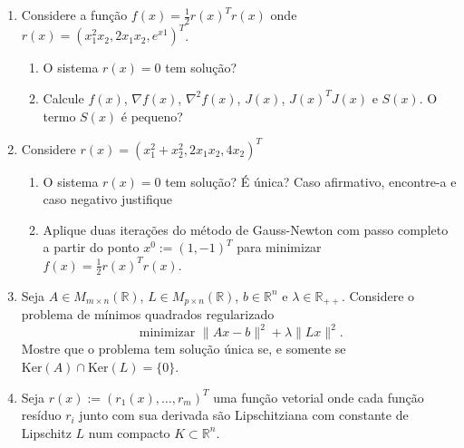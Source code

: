 \documentclass[a4paper,latin]{article}
\begin{document}
    \begin{enumerate}
    \item Considere a função 
    $f(x)=\frac{1}{2} r(x)^{T}r(x)$
    onde $r(x)=(x_{1}^{2}x_2, 2x_1x_2, e^{x1})^{T}$.
       \begin{enumerate}
       	\item O sistema $r(x)=0$
       	tem solução?
       	\item Calcule 
       	$f(x)$, $\nabla f(x)$, $\nabla^{2}f(x)$, 
       	$J(x)$, $J(x)^{T}J(x)$ e $S(x)$. O termo $S(x)$ é pequeno? 
       \end{enumerate}	
    \item Considere 
     $r(x)=(x_{1}^{2}+x_{2}^{2}, 2x_1x_2, 4x_2)^{T}$
       \begin{enumerate}
       	\item O sistema $r(x)=0$ tem solução?
       	É única? Caso afirmativo, encontre-a e caso negativo justifique
       	\item Aplique duas iterações do método de Gauss-Newton com passo completo a partir do ponto 
       	$x^0:=(1,-1)^{T}$ para minimizar 
       	$f(x)=\frac{1}{2}r(x)^{T}r(x)$.
       \end{enumerate}
    \item Seja 
    $A \in M_{m \times n}(\mathbb{R})$, 
    $L \in M_{p \times n}(\mathbb{R})$, 
    $b \in \mathbb{R}^{n}$
    e $\lambda \in \mathbb{R}_{++}$. Considere o problema de mínimos quadrados regularizado 
    $$ \text{ minimizar } 
    \|Ax-b\|^{2}+\lambda \|Lx\|^{2}. $$
    Mostre que o problema tem solução única se, e somente se 
    $\text{Ker}(A)
     \cap 
     \text{Ker}(L)=\{0\}$.
    \item Seja $r(x):=(r_1(x), \dots, r_{m})^{T}$ uma função vetorial onde 
    cada função resíduo $r_{i}$ junto com sua derivada são Lipschitziana com constante de Lipschitz $L$ num compacto $K \subset \mathbb{R}^{n}$.
    

\end{enumerate}
\end{document}
